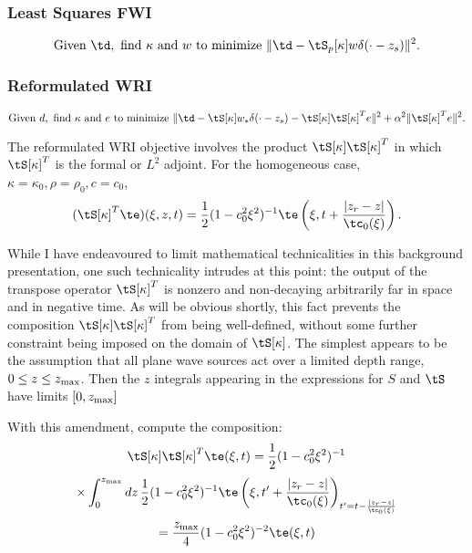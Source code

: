 \subsubsection{Least Squares FWI}

\begin{equation}
  \label{eqn:defolspw}
  \mbox{Given } \td, \mbox{ find }\kappa \mbox{ and }w \mbox{ to
    minimize }
  \| \td -  \tS_p[\kappa]w\delta(\cdot-z_s)\|^2.
\end{equation}

\subsubsection{Reformulated WRI}

\begin{equation}
  \label{eqn:defwrireformpw}
  \mbox{Given } d, \mbox{ find }\kappa \mbox{ and }e \mbox{ to
    minimize }
  \| \td -  \tS[\kappa]w_*\delta(\cdot-z_s) - \tS[\kappa]\tS[\kappa]^Te\|^2+\alpha^2\|\tS[\kappa]^Te\|^2.
\end{equation}
                              
The reformulated WRI objective involves 
the product $\tS[\kappa]\tS[\kappa]^T$ in which $\tS[\kappa]^T$ is the
formal or $L^2$ adjoint. For the homogeneous case,
$\kappa=\kappa_0,\rho=\rho_0,c=c_0$,
\begin{equation}
  \label{eqn:stmodhompwtrans}
  (\tS[\kappa]^T\te)(\xi,z,t)=\frac{1}{2}(1-c_0^2\xi^2)^{-1}\te\left(\xi,t +
    \frac{|z_r-z|}{\tc_0(\xi)}\right).
\end{equation}

While I have endeavoured to limit mathematical technicalities in this background
presentation, one such technicality intrudes at this point: the
output of the transpose operator $\tS[\kappa]^T$ is nonzero and non-decaying arbitrarily
far in space and in negative time. As will be obvious shortly, this
fact prevents the composition $\tS[\kappa]\tS[\kappa]^T$ from being
well-defined, without some further constraint being imposed on the
domain of $\tS[\kappa]$. The simplest appears to be the assumption
that all plane wave sources act over a limited depth range, $0 \le z
\le z_{\rm max}$. Then the $z$ integrals appearing in the expressions
for $S$ and $\tS$ have limits $[0,z_{\rm max}]$

With this amendment, compute the composition:
\[
  \tS[\kappa]\tS[\kappa]^T\te(\xi,t) = \frac{1}{2}(1-c_0^2\xi^2)^{-1}
\]
\[
  \times 
  \int_0^{z_{\rm max}} dz\, \frac{1}{2}(1-c_0^2\xi^2)^{-1}\te\left(\xi,t' +
    \frac{|z_r-z|}{\tc_0(\xi)}\right)_{t'=t-\frac{|z_r-z|}{\tc_0(\xi)}}
\]
\begin{equation}
  \label{eqn:stmodhompwnorm}
 = \frac{z_{\rm max}}{4}(1-c_0^2\xi^2)^{-2}\te(\xi,t)
\end{equation}

